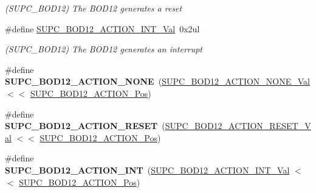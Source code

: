 \begin{DoxyCompactItemize}
\begin{DoxyCompactList}\small\item\em (S\+U\+P\+C\+\_\+\+B\+O\+D12) The B\+O\+D12 generates a reset \end{DoxyCompactList}\item 
\hypertarget{group___s_a_m_l21___s_u_p_c_ga68fbf7cf5437835c0ce40da130a24091}{}\#define \hyperlink{group___s_a_m_l21___s_u_p_c_ga68fbf7cf5437835c0ce40da130a24091}{S\+U\+P\+C\+\_\+\+B\+O\+D12\+\_\+\+A\+C\+T\+I\+O\+N\+\_\+\+I\+N\+T\+\_\+\+Val}~0x2ul\label{group___s_a_m_l21___s_u_p_c_ga68fbf7cf5437835c0ce40da130a24091}

\begin{DoxyCompactList}\small\item\em (S\+U\+P\+C\+\_\+\+B\+O\+D12) The B\+O\+D12 generates an interrupt \end{DoxyCompactList}\item 
\hypertarget{group___s_a_m_l21___s_u_p_c_ga6292981f0a2625209a5cf8498781944e}{}\#define {\bfseries S\+U\+P\+C\+\_\+\+B\+O\+D12\+\_\+\+A\+C\+T\+I\+O\+N\+\_\+\+N\+O\+N\+E}~(\hyperlink{group___s_a_m_l21___s_u_p_c_ga5e7845e1cb412b9f866e8ebca998649d}{S\+U\+P\+C\+\_\+\+B\+O\+D12\+\_\+\+A\+C\+T\+I\+O\+N\+\_\+\+N\+O\+N\+E\+\_\+\+Val}    $<$$<$ \hyperlink{group___s_a_m_l21___s_u_p_c_gad1ccda9df0fab2362d28ce68c0d82edc}{S\+U\+P\+C\+\_\+\+B\+O\+D12\+\_\+\+A\+C\+T\+I\+O\+N\+\_\+\+Pos})\label{group___s_a_m_l21___s_u_p_c_ga6292981f0a2625209a5cf8498781944e}

\item 
\hypertarget{group___s_a_m_l21___s_u_p_c_gae9182de06d29c1698b7f1df7f066ebd0}{}\#define {\bfseries S\+U\+P\+C\+\_\+\+B\+O\+D12\+\_\+\+A\+C\+T\+I\+O\+N\+\_\+\+R\+E\+S\+E\+T}~(\hyperlink{group___s_a_m_l21___s_u_p_c_ga14d7caf275fd219978d42d55ab27a522}{S\+U\+P\+C\+\_\+\+B\+O\+D12\+\_\+\+A\+C\+T\+I\+O\+N\+\_\+\+R\+E\+S\+E\+T\+\_\+\+Val}   $<$$<$ \hyperlink{group___s_a_m_l21___s_u_p_c_gad1ccda9df0fab2362d28ce68c0d82edc}{S\+U\+P\+C\+\_\+\+B\+O\+D12\+\_\+\+A\+C\+T\+I\+O\+N\+\_\+\+Pos})\label{group___s_a_m_l21___s_u_p_c_gae9182de06d29c1698b7f1df7f066ebd0}

\item 
\hypertarget{group___s_a_m_l21___s_u_p_c_gaf381210241473b58ce6939d9a4bf144a}{}\#define {\bfseries S\+U\+P\+C\+\_\+\+B\+O\+D12\+\_\+\+A\+C\+T\+I\+O\+N\+\_\+\+I\+N\+T}~(\hyperlink{group___s_a_m_l21___s_u_p_c_ga68fbf7cf5437835c0ce40da130a24091}{S\+U\+P\+C\+\_\+\+B\+O\+D12\+\_\+\+A\+C\+T\+I\+O\+N\+\_\+\+I\+N\+T\+\_\+\+Val}     $<$$<$ \hyperlink{group___s_a_m_l21___s_u_p_c_gad1ccda9df0fab2362d28ce68c0d82edc}{S\+U\+P\+C\+\_\+\+B\+O\+D12\+\_\+\+A\+C\+T\+I\+O\+N\+\_\+\+Pos})\label{group___s_a_m_l21___s_u_p_c_gaf381210241473b58ce6939d9a4bf144a}


\end{DoxyCompactItemize}
